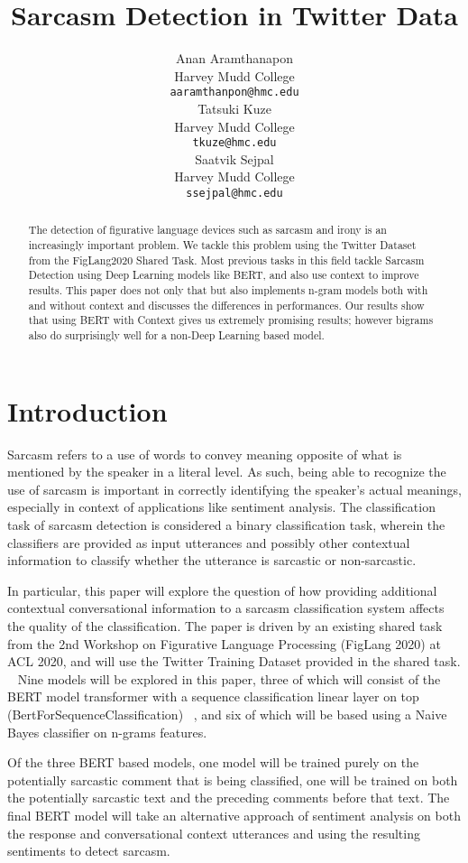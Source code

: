 \documentclass[11pt,a4paper]{article}
\title{Sarcasm Detection in Twitter Data}
\author{Anan Aramthanapon \\
  Harvey Mudd College \\
  \texttt{aaramthanpon@hmc.edu} \\\And
  Tatsuki Kuze \\
  Harvey Mudd College \\
  \texttt{tkuze@hmc.edu} \\\And
  Saatvik Sejpal \\
  Harvey Mudd College \\
  \texttt{ssejpal@hmc.edu} \\
  }
\date{}
\begin{document}
\maketitle

\begin{abstract}
 The detection of figurative language devices such as sarcasm and irony is an increasingly important problem. We tackle this problem using the Twitter Dataset from the
 FigLang2020 Shared Task. Most previous tasks in this field tackle Sarcasm Detection using Deep Learning models like BERT, and also use context to improve results. This
 paper does not only that but also implements n-gram models both with and without context and discusses the differences in performances. Our results show that using BERT with
 Context gives us extremely promising results; however bigrams also do surprisingly well for a non-Deep Learning based model.
\end{abstract}
\section{Introduction}

Sarcasm refers to a use of words to convey meaning opposite of what is mentioned by the speaker in a literal level. As such, being able to recognize the use of sarcasm is important in correctly identifying the speaker’s actual meanings, especially in context of applications like sentiment analysis. The classification task of sarcasm detection is considered a binary classification task, wherein the classifiers are provided as input utterances and possibly other contextual information to classify whether the utterance is sarcastic or non-sarcastic. 

In particular, this paper will explore the question of how providing additional contextual conversational information to a sarcasm classification system affects the quality of the
classification. The paper is driven by an existing shared task from the 2nd Workshop on Figurative Language Processing (FigLang 2020) at ACL 2020, and will use the Twitter Training
Dataset provided in the shared task. ~\cite{Ghosh-Muresan} Nine models will be explored in this paper, three of which will consist of the BERT model transformer with a sequence
classification linear layer on top (BertForSequenceClassification) ~\cite{devlin-etal-2019-bert}, and six of which will be based using a Naive Bayes classifier on n-grams features.

Of the
three BERT based models, one model will be trained purely on the potentially sarcastic comment that is being classified, one will be trained on both the potentially sarcastic text
and the preceding comments before that text. The final BERT model will take an alternative approach of sentiment analysis on both the response and conversational context utterances
and using the resulting sentiments to detect sarcasm. 
\end{document}
